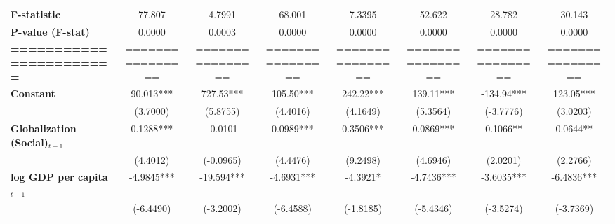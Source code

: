 \begin{center}
\begin{tabular}{lccccccc}
\textbf{F-statistic}               &        77.807        &            4.7991           &            68.001            &                7.3395               &              52.622              &            28.782           &             30.143             \\
\textbf{P-value (F-stat)}          &        0.0000        &            0.0003           &            0.0000            &                0.0000               &              0.0000              &            0.0000           &             0.0000             \\
\textbf{=======================}   &   ================   &       ================      &       ================       &           ================          &         ================         &       ================      &        ================        \\
\textbf{Constant}                     &      90.013***       &          727.53***          &          105.50***           &              242.22***              &            139.11***             &          -134.94***         &           123.05***            \\
\textbf{ }                         &       (3.7000)       &           (5.8755)          &           (4.4016)           &               (4.1649)              &             (5.3564)             &          (-3.7776)          &            (3.0203)            \\
\textbf{Globalization (Social)$_{t-1}$}             &      0.1288***       &           -0.0101           &          0.0989***           &              0.3506***              &            0.0869***             &           0.1066**          &            0.0644**            \\
\textbf{ }                         &       (4.4012)       &          (-0.0965)          &           (4.4476)           &               (9.2498)              &             (4.6946)             &           (2.0201)          &            (2.2766)            \\
\textbf{log GDP per capita$_{t-1}$}           &      -4.9845***      &          -19.594***         &          -4.6931***          &               -4.3921*              &            -4.7436***            &          -3.6035***         &           -6.4836***           \\
\textbf{ }                         &      (-6.4490)       &          (-3.2002)          &          (-6.4588)           &              (-1.8185)              &            (-5.4346)             &          (-3.5274)          &           (-3.7369)            \\

\end{tabular}
\end{center}

